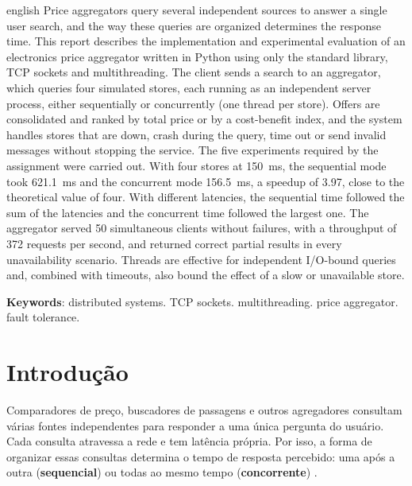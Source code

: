 \begin{resumo}[Abstract]
\begin{otherlanguage*}{english}
Price aggregators query several independent sources to answer a single user search, and the way these queries are organized determines the response time. This report describes the implementation and experimental evaluation of an electronics price aggregator written in Python using only the standard library, TCP sockets and multithreading. The client sends a search to an aggregator, which queries four simulated stores, each running as an independent server process, either sequentially or concurrently (one thread per store). Offers are consolidated and ranked by total price or by a cost-benefit index, and the system handles stores that are down, crash during the query, time out or send invalid messages without stopping the service. The five experiments required by the assignment were carried out. With four stores at 150~ms, the sequential mode took 621.1~ms and the concurrent mode 156.5~ms, a speedup of 3.97, close to the theoretical value of four. With different latencies, the sequential time followed the sum of the latencies and the concurrent time followed the largest one. The aggregator served 50 simultaneous clients without failures, with a throughput of 372 requests per second, and returned correct partial results in every unavailability scenario. Threads are effective for independent I/O-bound queries and, combined with timeouts, also bound the effect of a slow or unavailable store.

\vspace{\onelineskip}
\noindent\textbf{Keywords}: distributed systems. TCP sockets. multithreading. price aggregator. fault tolerance.
\end{otherlanguage*}
\end{resumo}

\listafiguras
\listaquadros
\listatabelas
\sumario

\textual

\chapter{Introdução}

Comparadores de preço, buscadores de passagens e outros agregadores consultam várias fontes independentes para responder a uma única pergunta do usuário. Cada consulta atravessa a rede e tem latência própria. Por isso, a forma de organizar essas consultas determina o tempo de resposta percebido: uma após a outra (\textbf{sequencial}) ou todas ao mesmo tempo (\textbf{concorrente}) \cite{tanenbaum2007}.

